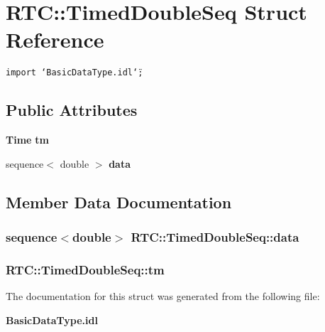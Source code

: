 \section{RTC::Timed\-Double\-Seq Struct Reference}
\label{structRTC_1_1TimedDoubleSeq}
{\tt import \char`\"{}Basic\-Data\-Type.idl\char`\"{};}

\subsection*{Public Attributes}
\begin{CompactItemize}
\item 
{\bf Time} {\bf tm}
\item 
sequence$<$ double $>$ {\bf data}
\end{CompactItemize}


\subsection{Member Data Documentation}
\subsubsection{\setlength{\rightskip}{0pt plus 5cm}sequence$<$double$>$ {\bf RTC::Timed\-Double\-Seq::data}}\label{structRTC_1_1TimedDoubleSeq_RTC_1_1TimedDoubleSeqo1}


\subsubsection{ {\bf RTC::Timed\-Double\-Seq::tm}}\label{structRTC_1_1TimedDoubleSeq_RTC_1_1TimedDoubleSeqo0}




The documentation for this struct was generated from the following file:\begin{CompactItemize}
\item 
{\bf Basic\-Data\-Type.idl}\end{CompactItemize}
